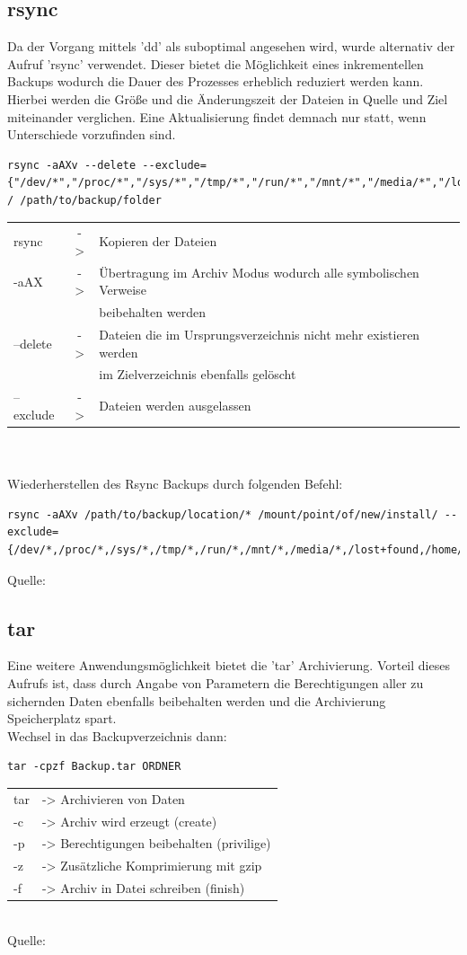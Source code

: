 \subsection{rsync}
Da der Vorgang mittels 'dd' als suboptimal angesehen wird, wurde alternativ der Aufruf 'rsync' verwendet. Dieser bietet die Möglichkeit eines inkrementellen Backups wodurch die Dauer des Prozesses erheblich reduziert werden kann. Hierbei werden die Größe und die Änderungszeit der Dateien in Quelle und Ziel miteinander verglichen. Eine Aktualisierung findet demnach nur statt, wenn Unterschiede vorzufinden sind.
\begin{lstlisting}
rsync -aAXv --delete --exclude={"/dev/*","/proc/*","/sys/*","/tmp/*","/run/*","/mnt/*","/media/*","/lost+found"} / /path/to/backup/folder
\end{lstlisting}
\begin{tabular}{l c l}
rsync	&->& Kopieren der Dateien\\
-aAX	&->& Übertragung im Archiv Modus wodurch alle symbolischen Verweise\\
	&  & beibehalten werden\\
--delete&->& Dateien die im Ursprungsverzeichnis nicht mehr existieren werden\\
	&  & im Zielverzeichnis ebenfalls gelöscht\\
--exclude&->& Dateien werden ausgelassen\\
\end{tabular}\\\\
Wiederherstellen des Rsync Backups durch folgenden Befehl:
\begin{lstlisting}
rsync -aAXv /path/to/backup/location/* /mount/point/of/new/install/ --exclude={/dev/*,/proc/*,/sys/*,/tmp/*,/run/*,/mnt/*,/media/*,/lost+found,/home/*}
\end{lstlisting}
Quelle: \cite{rsync}
\subsection{tar} %
Eine weitere Anwendungsmöglichkeit bietet die 'tar' Archivierung. Vorteil dieses Aufrufs ist, dass durch Angabe von Parametern die Berechtigungen aller zu sichernden Daten ebenfalls beibehalten werden und die Archivierung Speicherplatz spart.\\
Wechsel in das Backupverzeichnis dann:
\begin{lstlisting}
tar -cpzf Backup.tar ORDNER
\end{lstlisting}
\begin{tabular}{l l}
tar	&-> Archivieren von Daten\\
-c	&-> Archiv wird erzeugt (create)\\
-p	&-> Berechtigungen beibehalten (privilige)\\
-z	&-> Zusätzliche Komprimierung mit gzip\\
-f	&-> Archiv in Datei schreiben (finish)\\
\end{tabular}
 ~\\Quelle: \cite{tar}

